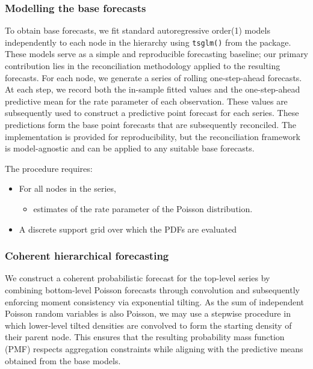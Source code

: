 \subsubsection{Modelling the base forecasts}\label{modelling-the-base-forecasts}

To obtain base forecasts, we fit standard autoregressive order(1) models independently to each node in the hierarchy using \texttt{tsglm()} from the  package. These models serve as a simple and reproducible forecasting baseline; our primary contribution lies in the reconciliation methodology applied to the resulting forecasts. For each node, we generate a series of rolling one-step-ahead forecasts. At each step, we record both the in-sample fitted values and the one-step-ahead predictive mean for the rate parameter of each observation. These values are subsequently used to construct a predictive point forecast for each series. These predictions form the base point forecasts that are subsequently reconciled. The implementation is provided for reproducibility, but the reconciliation framework is model-agnostic and can be applied to any suitable base forecasts.

The procedure requires:

\begin{itemize}
\tightlist
\item
  For all nodes in the series,

  \begin{itemize}
  \tightlist
  \item
    estimates of the rate parameter of the Poisson distribution.
  \end{itemize}
\item
  A discrete support grid over which the PDFs are evaluated
\end{itemize}

\subsubsection{Coherent hierarchical forecasting}\label{coherent-hierarchical-forecasting}

We construct a coherent probabilistic forecast for the top-level series by combining bottom-level Poisson forecasts through convolution and subsequently enforcing moment consistency via exponential tilting. As the sum of independent Poisson random variables is also Poisson, we may use a stepwise procedure in which lower-level tilted densities are convolved to form the starting density of their parent node. This ensures that the resulting probability mass function (PMF) respects aggregation constraints while aligning with the predictive means obtained from the base models.

